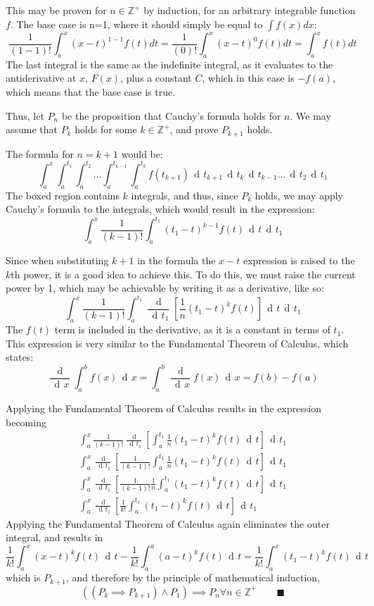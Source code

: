 \documentclass{article}
\DeclareMathOperator{\di}{\,d\!}
\begin{document}
This may be proven for $n \in \mathbb{Z}^+$ by induction, for an arbitrary
integrable function $f$. The base case is n=1, where it should simply be equal
to
$\int
f\left(x\right)dx$:
$$
\frac{1}{(1-1)!}\int_a^x\left(x-t\right)^{1-1}f\left(t\right)dt =
\frac{1}{(0)!}\int_a^x\left(x-t\right)^{0}f\left(t\right)dt =
\int_a^xf\left(t\right)dt
$$
The last integral is the same as the indefinite integral, as it evaluates to
the antiderivative at $x$, $F(x)$, plus a constant $C$, which in this case is
$-f(a)$, which means that the base case is true.

Thus, let $P_n$ be the proposition that Cauchy's formula holds for $n$. We may
assume that $P_k$ holds for some $k \in \mathbb{Z}^+$, and prove $P_{k+1}$
holds.

The formula for $n = k + 1$ would be:
$$
\int_a^x
\boxed{
\int_a^{t_1}
\int_a^{t_2}
\ldots
\int_a^{t_{k-1}}
\int_a^{t_k}f\left(t_{k+1}\right) \di t_{k+1}\di t_k\di t_{k-1} \ldots \di t_2}\di t_1
$$
The boxed region contains $k$ integrals, and thus, since $P_k$ holds, we may apply
Cauchy's formula to the integrals, which would result in the expression:
$$
\int_a^x
\frac{1}{(k-1)!}\int_a^{t_1}\left(t_1-t\right)^{k-1}f\left(t\right)\di t\di t_1
$$

Since when substituting $k+1$ in the formula the $x-t$ expression is raised to
the $k$th power, it is a good idea to achieve this. To do this, we must raise
the current power by 1, which may be achievable by writing it as a derivative,
like so:
$$
\int_a^x
\frac{1}{(k-1)!}\int_a^{t_1}\frac{\di}{\di t_1}\left[\frac{1}{n}\left(t_1-t\right)^k f\left(t\right)\right]\di t\di t_1
$$
The $f(t)$ term is included in the derivative, as it is a constant in terms of
$t_1$. This expression is very similar to the Fundamental Theorem of Calculus,
which states:
$$
\frac{\di}{\di x}\int_a^bf(x)\di x = \int_a^b\frac{\di}{\di x}f(x) \di x = f(b)- f(a)
$$

Applying the Fundamental Theorem of Calculus results in the expression becoming
\begin{gather*}
\int_a^x
\frac{1}{(k-1)!}\frac{\di}{\di t_1}\left[\int_a^{t_1}\frac{1}{n}\left(t_1-t\right)^k f(t)\di t\right]\di t_1 \\
\int_a^x
\frac{\di}{\di t_1}\left[\frac{1}{(k-1)!}\int_a^{t_1}\frac{1}{n}\left(t_1-t\right)^k f(t)\di t\right]\di t_1 \\
\int_a^x
\frac{\di}{\di t_1}\left[\frac{1}{(k-1)!}\frac{1}{n}\int_a^{t_1}\left(t_1-t\right)^k f(t)\di t\right]\di t_1 \\
\int_a^x
\frac{\di}{\di t_1}\left[\frac{1}{k!}\int_a^{t_1}\left(t_1-t\right)^k f(t)\di t\right]\di t_1
\end{gather*}
Applying the Fundamental Theorem of Calculus again eliminates the outer integral,
and results in
$$
\frac{1}{k!}\int_a^x\left(x-t\right)^k f(t)\di t -
\frac{1}{k!}\int_a^a\left(a-t\right)^k f(t)\di t =
\frac{1}{k!}\int_a^x\left(t_1-t\right)^k f(t)\di t
$$
which is $P_{k+1}$, and therefore by the principle of mathematical induction,
$$
\left(\left(P_k \implies P_{k+1}\right) \land P_1\right)
\implies P_n \forall n \in \mathbb{Z}^+
\qquad \blacksquare
$$
\end{document}
